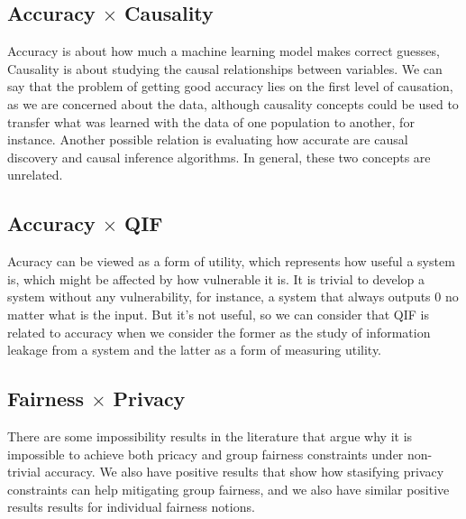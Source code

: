 \subsection{Accuracy $\times$ Causality}

Accuracy is about how much a machine learning model makes correct guesses, Causality is about studying the causal relationships between variables. We can say that the problem of getting good accuracy lies on the first level of causation, as we are concerned about the data, although causality concepts could be used to transfer what was learned with the data of one population to another, for instance. Another possible relation is evaluating how accurate are causal discovery and causal inference algorithms. In general, these two concepts are unrelated.

\subsection{Accuracy $\times$ QIF}

Acuracy can be viewed as a form of utility, which represents how useful a system is, which might be affected by how vulnerable it is. It is trivial to develop a system without any vulnerability, for instance, a system that always outputs $0$ no matter what is the input. But it's not useful, so we can consider that QIF is related to accuracy when we consider the former as the study of information leakage from a system and the latter as a form of measuring utility.

\subsection{Fairness $\times$ Privacy}

There are some impossibility results in the literature that argue why it is impossible to achieve both pricacy and group fairness constraints under non-trivial accuracy\cite{On the Compatibility of Privacy and Fairness}. We also have positive results that show how stasifying privacy constraints can help mitigating group fairness\cite{A Systematic and Formal Study of the Impact of Local Differential Privacy on Fairness: Preliminary Results}\cite{On the impact of multi-dimensional local differential privacy on fairness}\cite{(Local) Differential Privacy has NO Disparate Impact on Fairness}, and we also have similar positive results results for individual fairness notions\cite{Awareness}.

